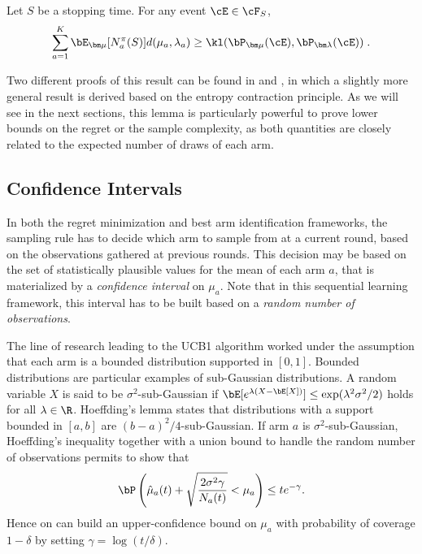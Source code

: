 \documentclass[proc]{edpsmath}
\begin{document}
	\begin{lemma}\label{lem:CD} Let $S$ be a stopping time. For any event $\cE \in \cF_{S}$,
		\[\sum_{a=1}^K\bE_{\bm\mu}[N_a^\pi(S)]d(\mu_a,\lambda_a) \geq \kl(\bP_{\bm\mu}(\cE),\bP_{\bm\lambda}(\cE))\;.\]
	\end{lemma}
	Two different proofs of this result can be found in \cite{JMLR15} and \cite{GMS16}, in which a slightly more general result is derived based on the entropy contraction principle. As we will see in the next sections, this lemma is particularly powerful to prove lower bounds on the regret or the sample complexity, as both quantities are closely related to the expected number of draws of each arm. 
	
	
	\subsection{Confidence Intervals}\label{subsec:CI}
	
	In both the regret minimization and best arm identification frameworks, the sampling rule has to decide which arm to sample from at a current round, based on the observations gathered at previous rounds. This decision may be based on the set of statistically plausible values for the mean of each arm $a$, that is materialized by a \emph{confidence interval} on $\mu_a$. Note that  in this sequential learning framework, this interval has to be built based on a \emph{random number of observations}. 
	
	The line of research leading to the UCB1 algorithm \cite{Aueral02} worked under the assumption that each arm is a bounded distribution supported in $[0,1]$. Bounded distributions are particular examples of sub-Gaussian distributions. A random variable $X$ is said to be $\sigma^2$-sub-Gaussian if $\bE[e^{\lambda (X - \bE[X])}] \leq \exp({\lambda^2\sigma^2}/{2})$ holds for all $\lambda\in\R$. Hoeffding's lemma states that distributions with a support bounded in $[a,b]$ are $(b-a)^2/4$-sub-Gaussian. If arm $a$ is $\sigma^2$-sub-Gaussian, Hoeffding's inequality together with a union bound to handle the random number of observations permits to show that 
	\begin{equation}\bP\left(\hat{\mu}_a(t) + \sqrt{\frac{2\sigma^2 \gamma}{N_a(t)}} < \mu_a\right) \leq t e^{-\gamma}.\label{bound:UCB1}\end{equation}
	Hence on can build an upper-confidence bound on $\mu_a$ with probability of coverage $1 - \delta$ by setting $\gamma = \log(t/\delta)$.
	
\end{document}
